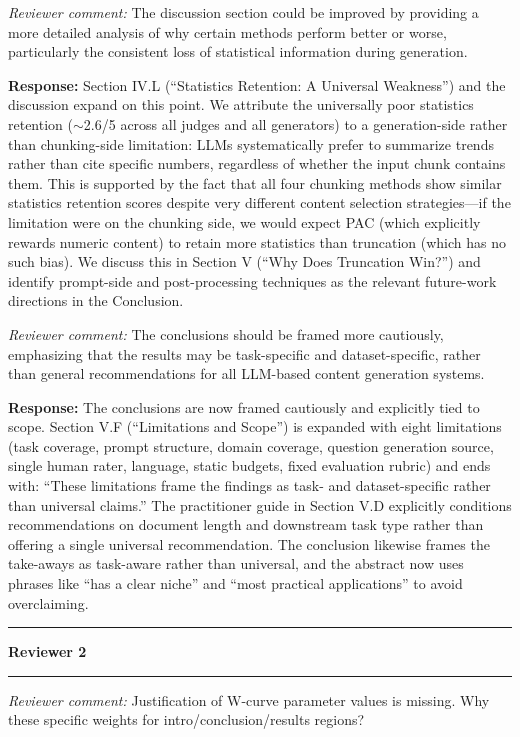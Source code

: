\documentclass[11pt]{article}
\newcommand{\reviewer}[1]{\noindent\textbf{\large Reviewer #1}\medskip\hrule\medskip}
\newcommand{\rcomment}[1]{\noindent\textcolor{revcomment}{\textit{Reviewer comment:}} #1\medskip}
\newcommand{\rresponse}[1]{\noindent\textcolor{response}{\textbf{Response:}} #1\medskip\medskip}
\begin{document}
\rcomment{The discussion section could be improved by providing a more detailed analysis of why certain methods perform better or worse, particularly the consistent loss of statistical information during generation.}

\rresponse{Section IV.L (``Statistics Retention: A Universal Weakness'') and the discussion expand on this point. We attribute the universally poor statistics retention ($\sim$2.6/5 across all judges and all generators) to a generation-side rather than chunking-side limitation: LLMs systematically prefer to summarize trends rather than cite specific numbers, regardless of whether the input chunk contains them. This is supported by the fact that all four chunking methods show similar statistics retention scores despite very different content selection strategies---if the limitation were on the chunking side, we would expect PAC (which explicitly rewards numeric content) to retain more statistics than truncation (which has no such bias). We discuss this in Section V (``Why Does Truncation Win?'') and identify prompt-side and post-processing techniques as the relevant future-work directions in the Conclusion.}

\rcomment{The conclusions should be framed more cautiously, emphasizing that the results may be task-specific and dataset-specific, rather than general recommendations for all LLM-based content generation systems.}

\rresponse{The conclusions are now framed cautiously and explicitly tied to scope. Section V.F (``Limitations and Scope'') is expanded with eight limitations (task coverage, prompt structure, domain coverage, question generation source, single human rater, language, static budgets, fixed evaluation rubric) and ends with: ``These limitations frame the findings as task- and dataset-specific rather than universal claims.'' The practitioner guide in Section V.D explicitly conditions recommendations on document length and downstream task type rather than offering a single universal recommendation. The conclusion likewise frames the take-aways as task-aware rather than universal, and the abstract now uses phrases like ``has a clear niche'' and ``most practical applications'' to avoid overclaiming.}

\bigskip
\hrule
\bigskip

\reviewer{2}

\rcomment{Justification of W-curve parameter values is missing. Why these specific weights for intro/conclusion/results regions?}
\end{document}
